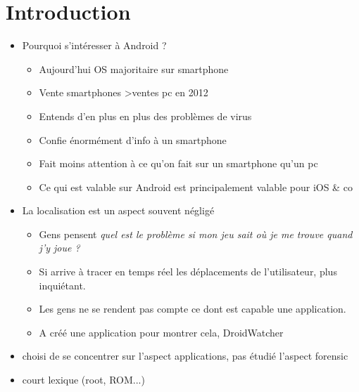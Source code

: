 
\section*{Introduction}
\label{sec:andro-into}

\begin{itemize}
\item Pourquoi s'intéresser à Android ?
  \begin{itemize}
  \item Aujourd'hui OS majoritaire sur smartphone
  \item Vente smartphones \textgreater ventes pc en 2012
  \item Entends d'en plus en plus des problèmes de virus
  \item Confie énormément d'info à un smartphone
  \item Fait moins attention à ce qu'on fait sur un smartphone qu'un pc
  \item Ce qui est valable sur Android est principalement valable pour iOS \& co
  \end{itemize}
\item La localisation est un aspect souvent négligé
  \begin{itemize}
  \item Gens pensent \emph{quel est le problème si mon jeu sait où je me trouve quand j'y joue ?}
  \item Si arrive à tracer en temps réel les déplacements de l'utilisateur, plus inquiétant.
  \item Les gens ne se rendent pas compte ce dont est capable une application.
  \item A créé une application pour montrer cela, DroidWatcher
  \end{itemize}
\item choisi de se concentrer sur l'aspect applications, pas étudié l'aspect forensic
\item court lexique (root, ROM...)
\end{itemize}